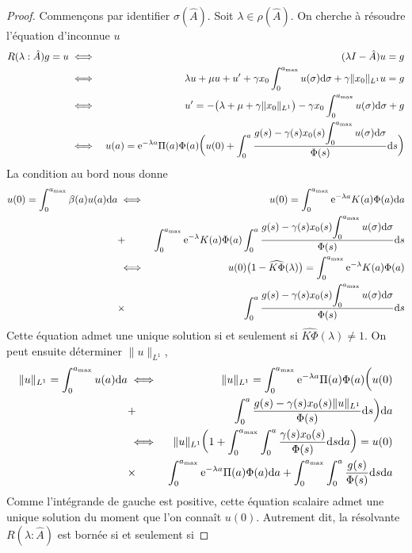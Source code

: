 \begin{proof}
    Commençons par identifier $\sigma(\hat{A})$. Soit $\lambda \in \rho(\hat{A})$. On cherche à résoudre l'équation d'inconnue $u$
    \begin{eqnarray*}
        R(\lambda:\hat{A})g = u &\iff& (\lambda I-\hat{A})u=g \\
        &\iff& \lambda u +\mu u +u' + \gamma x_0 \int_0^{a_{\max}}u(\sigma)\mathrm{d} \sigma + \gamma \|x_0\|_{L^1}u=g \\
        &\iff& u' = -\big(\lambda + \mu + \gamma \|x_0\|_{L^1}\big)-\gamma x_0 \int_0^{a_{\max}}u(\sigma)\mathrm{d} \sigma + g \\
        &\iff& u(a) = \mathrm{e}^{-\lambda a}\Pi(a)\Phi(a)\bigg(u(0)+\int_0^a \frac{g(s)-\gamma(s)x_0(s)\displaystyle{\int_0^{a_{\max}} u(\sigma)\mathrm{d}\sigma}}{\Phi(s)}\mathrm{d} s\bigg)
    \end{eqnarray*}
    La condition au bord nous donne 
    \begin{eqnarray*}
        u(0) = \int_0^{a_{\max}}\beta(a)u(a)\mathrm{d} a &\iff& u(0)=\int_0^{a_{\max}}\mathrm{e}^{-\lambda a}K(a)\Phi(a)\mathrm{d} a \\
        &+& \int_0^{a_{\max}}\mathrm{e}^{-\lambda}K(a)\Phi(a)\int_0^a \frac{g(s)-\gamma(s)x_0(s)\displaystyle{\int_0^{a_{\max}} u(\sigma)\mathrm{d}\sigma}}{\Phi(s)}\mathrm{d} s \\
        &\iff& u(0)\big(1-\widehat{K\Phi}(\lambda)\big) = \int_0^{a_{\max}}\mathrm{e}^{-\lambda}K(a)\Phi(a) \\
        &\times& \int_0^a \frac{g(s)-\gamma(s)x_0(s)\displaystyle{\int_0^{a_{\max}} u(\sigma)\mathrm{d}\sigma}}{\Phi(s)}\mathrm{d} s
    \end{eqnarray*}
    Cette équation admet une unique solution si et seulement si $\widehat{K\Phi}(\lambda) \neq 1$. On peut ensuite déterminer $\|u\|_{L^1}$, 
    \begin{eqnarray*}
        \|u\|_{L^1} = \int_0^{a_{\max}}u(a)\mathrm{d} a &\iff& \|u\|_{L^1} = \int_0^{a_{\max}}\mathrm{e}^{-\lambda a}\Pi(a)\Phi(a)\bigg(u(0)\\
        &+& \int_0^a \frac{g(s)-\gamma(s)x_0(s)\|u\|_{L^1}}{\Phi(s)}\mathrm{d} s\bigg) \mathrm{d} a \\
        &\iff& \|u\|_{L^1}\bigg(1+\int_0^{a_{\max}}\int_0^a \frac{\gamma(s)x_0(s)}{\Phi(s)}\mathrm{d} s\mathrm{d} a\bigg) = u(0) \\
        &\times& \int_0^{a_{\max}}\mathrm{e}^{-\lambda a}\Pi(a)\Phi(a)\mathrm{d} a + \int_0^{a_{\max}}\int_0^a \frac{g(s)}{\Phi(s)}\mathrm{d} s\mathrm{d} a
    \end{eqnarray*}
    Comme l'intégrande de gauche est positive, cette équation scalaire admet une unique solution du moment que l'on connaît $u(0)$. Autrement dit, la résolvante $R(\lambda : \hat{A})$ est bornée si et seulement si 

\end{proof}
